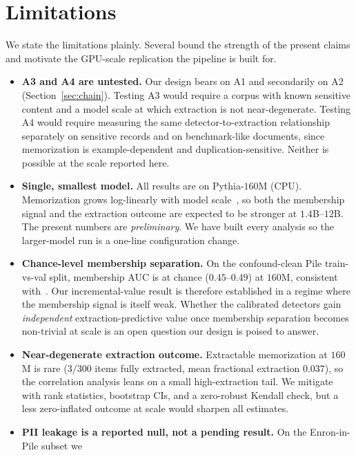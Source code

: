 \section{Limitations}
\label{sec:limitations}

We state the limitations plainly. Several bound the strength of the present claims and motivate the
GPU-scale replication the pipeline is built for.

\begin{itemize}
 \item \textbf{A3 and A4 are untested.} Our design bears on A1 and secondarily on A2
 (Section~\ref{sec:chain}). Testing A3 would require a corpus with known sensitive content and a
 model scale at which extraction is not near-degenerate. Testing A4 would require measuring the same
 detector-to-extraction relationship separately on sensitive records and on benchmark-like documents,
 since memorization is example-dependent and duplication-sensitive. Neither is possible at the scale
 reported here.
 \item \textbf{Single, smallest model.} All results are on Pythia-$160$M (CPU). Memorization grows
 log-linearly with model scale~\citep{carlini2023quantifying}, so both the membership signal and the
 extraction outcome are expected to be stronger at $1.4$B--$12$B. The present numbers are
 \emph{preliminary}. We have built every analysis so the larger-model run is a one-line
 configuration change.
 \item \textbf{Chance-level membership separation.} On the confound-clean Pile train-vs-val split,
 membership AUC is at chance ($0.45$--$0.49$) at $160$M, consistent with~\citep{duan2024mia}.
 Our incremental-value result is therefore established in a regime where the membership signal is
 itself weak. Whether the calibrated detectors gain \emph{independent} extraction-predictive value once
 membership separation becomes non-trivial at scale is an open question our design is poised to answer.
 \item \textbf{Near-degenerate extraction outcome.} Extractable memorization at $160$M is rare
 ($3/300$ items fully extracted, mean fractional extraction $0.037$), so the correlation analysis
 leans on a small high-extraction tail. We mitigate with rank statistics, bootstrap CIs, and a
 zero-robust Kendall check, but a less zero-inflated outcome at scale would sharpen all estimates.
 \item \textbf{PII leakage is a reported null, not a pending result.} On the Enron-in-Pile subset we

\end{itemize}
